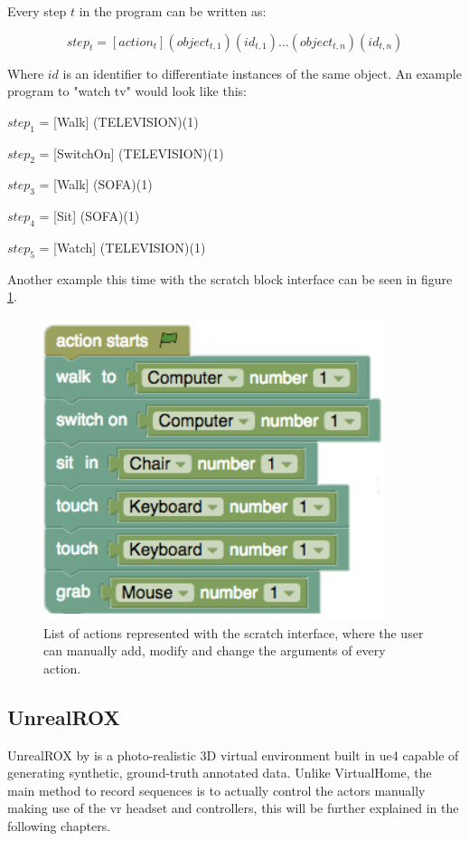 Every step $t$ in the program can be written as:

\[ step_t = [action_t] (object_{t,1})(id_{t,1}) ... (object_{t,n})(id_{t,n}) \]

Where $id$ is an identifier to differentiate instances of the same object. An example program to "watch tv" would look like this: 
\newline

$step_1$ = [Walk] (TELEVISION)(1)

$step_2$ = [SwitchOn] (TELEVISION)(1)

$step_3$ = [Walk] (SOFA)(1)

$step_4$ = [Sit] (SOFA)(1)

$step_5$ = [Watch] (TELEVISION)(1) \newline

Another example this time with the scratch block interface can be seen in figure \ref{fig:virtualhome_example}.

\begin{figure}[h]
	\includegraphics[scale=0.5]{archivos/virtualhome_example.png}
	\centering
	\caption{List of actions represented with the scratch interface, where the user can manually add, modify and change the arguments of every action.}
	\label{fig:virtualhome_example}
\end{figure}

\subsection{UnrealROX}
UnrealROX by \cite{DBLP:journals/corr/abs-1810-06936} is a photo-realistic 3D virtual environment built in \gls{ue4} capable of generating synthetic, ground-truth annotated data. Unlike VirtualHome, the main method to record sequences is to actually control the actors manually making use of the \gls{vr} headset and controllers, this will be further explained in the following chapters.


